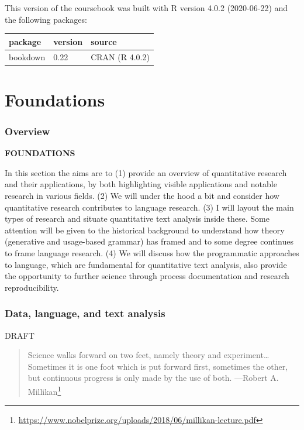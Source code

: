 \documentclass[
]{article}
\DeclareRobustCommand{\href}[2]{#2\footnote{\url{#1}}}
\begin{document}
This version of the coursebook was built with R version 4.0.2 (2020-06-22) and the following packages:

\begin{longtable}[]{@{}lll@{}}
\toprule
package & version & source \\
\midrule
\endhead
bookdown & 0.22 & CRAN (R 4.0.2) \\
\bottomrule
\end{longtable}

\hypertarget{part-foundations}{%
\part{Foundations}\label{part-foundations}}

\hypertarget{foundations-overview}{%
\section*{Overview}\label{foundations-overview}}

\textbf{FOUNDATIONS}

In this section the aims are to (1) provide an overview of quantitative research and their applications, by both highlighting visible applications and notable research in various fields. (2) We will under the hood a bit and consider how quantitative research contributes to language research. (3) I will layout the main types of research and situate quantitative text analysis inside these. Some attention will be given to the historical background to understand how theory (generative and usage-based grammar) has framed and to some degree continues to frame language research. (4) We will discuss how the programmatic approaches to language, which are fundamental for quantitative text analysis, also provide the opportunity to further science through process documentation and research reproducibility.

\hypertarget{data-language-and-text-analysis}{%
\section{Data, language, and text analysis}\label{data-language-and-text-analysis}}

DRAFT

\begin{quote}
Science walks forward on two feet, namely theory and experiment\ldots Sometimes it is one foot which is put forward first, sometimes the other, but continuous progress is only made by the use of both.
---\href{https://www.nobelprize.org/uploads/2018/06/millikan-lecture.pdf}{Robert A. Millikan} \citeyearpar{Millikan1923}
\end{quote}
\end{document}
